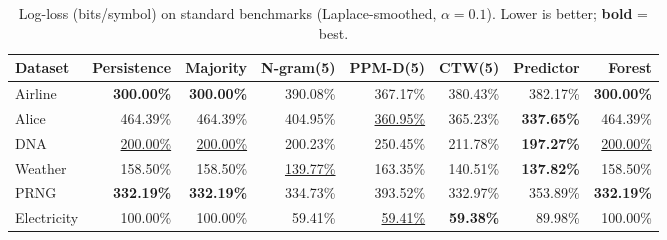 \begin{table}[h]
\centering
\caption{Log-loss (bits/symbol) on standard benchmarks (Laplace-smoothed, $\alpha{=}0.1$). Lower is better; \textbf{bold} = best.}
\label{tab:logloss}
\begin{tabular}{lrrrrrrr}
\toprule
Dataset & Persistence & Majority & N-gram(5) & PPM-D(5) & CTW(5) & Predictor & Forest \\
\midrule
Airline & \textbf{300.00\%} & \textbf{300.00\%} & 390.08\% & 367.17\% & 380.43\% & 382.17\% & \textbf{300.00\%} \\
Alice & 464.39\% & 464.39\% & 404.95\% & \underline{360.95\%} & 365.23\% & \textbf{337.65\%} & 464.39\% \\
DNA & \underline{200.00\%} & \underline{200.00\%} & 200.23\% & 250.45\% & 211.78\% & \textbf{197.27\%} & \underline{200.00\%} \\
Weather & 158.50\% & 158.50\% & \underline{139.77\%} & 163.35\% & 140.51\% & \textbf{137.82\%} & 158.50\% \\
PRNG & \textbf{332.19\%} & \textbf{332.19\%} & 334.73\% & 393.52\% & 332.97\% & 353.89\% & \textbf{332.19\%} \\
Electricity & 100.00\% & 100.00\% & 59.41\% & \underline{59.41\%} & \textbf{59.38\%} & 89.98\% & 100.00\% \\
\bottomrule
\end{tabular}
\end{table}
